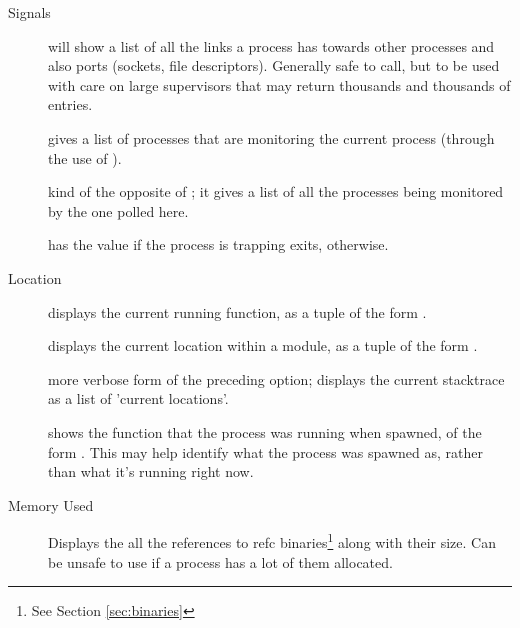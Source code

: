 \documentclass[11pt, oneside]{book}   	%
\begin{document}
\begin{description*}
\begin{description}
		\end{description}
	\item[Signals] \hfill
		\begin{description}
			\item[] will show a list of all the links a process has towards other processes and also ports (sockets, file descriptors). Generally safe to call, but to be used with care on large supervisors that may return thousands and thousands of entries.
			
			\item[] gives a list of processes that are monitoring the current process (through the use of ).
			
			\item[] kind of the opposite of ; it gives a list of all the processes being monitored by the one polled here.
					
			\item[] has the value  if the process is trapping exits,  otherwise.
		\end{description}		
		
	\item[Location] \hfill
		\begin{description}
			\item[] displays the current running function, as a tuple of the form .

			\item[] displays the current location within a module, as a tuple of the form .
			
			\item[] more verbose form of the preceding option; displays the current stacktrace as a list of 'current locations'.
			
			\item[] shows the function that the process was running when spawned, of the form . This may help identify what the process was spawned as, rather than what it's running right now.
			
		\end{description}
	\item[Memory Used] \hfill
		\begin{description}
			\item[] Displays the all the references to refc binaries\footnote{See Section \ref{sec:binaries}} along with their size. Can be unsafe to use if a process has a lot of them allocated.
			

\end{description}
\end{description*}
\end{document}
